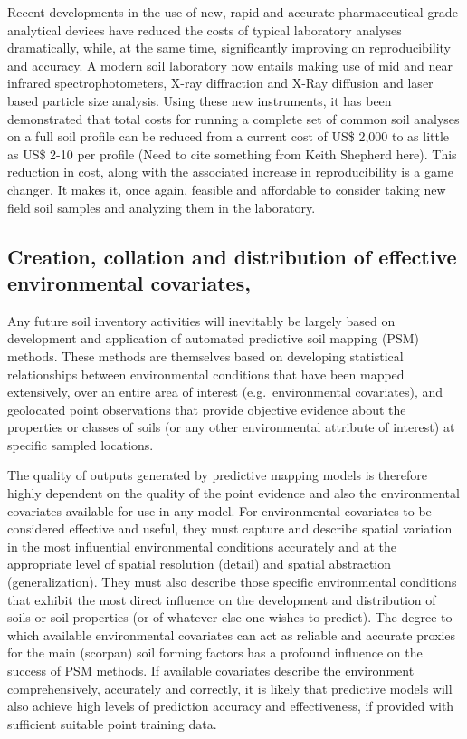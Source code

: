 \documentclass[graybox,natbib,nospthms,UStrade]{svmono}
\begin{document}
Recent developments in the use of new, rapid and accurate pharmaceutical
grade analytical devices have reduced the costs of typical laboratory
analyses dramatically, while, at the same time, significantly improving
on reproducibility and accuracy. A modern soil laboratory now entails
making use of mid and near infrared spectrophotometers, X-ray
diffraction and X-Ray diffusion and laser based particle size analysis.
Using these new instruments, it has been demonstrated that total costs
for running a complete set of common soil analyses on a full soil
profile can be reduced from a current cost of US\$ 2,000 to as little as
US\$ 2-10 per profile (Need to cite something from Keith Shepherd here).
This reduction in cost, along with the associated increase in
reproducibility is a game changer. It makes it, once again, feasible and
affordable to consider taking new field soil samples and analyzing them
in the laboratory.

\hypertarget{creation-collation-and-distribution-of-effective-environmental-covariates}{%
\subsection{Creation, collation and distribution of effective environmental covariates,}\label{creation-collation-and-distribution-of-effective-environmental-covariates}}

Any future soil inventory activities will inevitably be largely based on
development and application of automated predictive soil mapping (PSM)
methods. These methods are themselves based on developing statistical
relationships between environmental conditions that have been mapped
extensively, over an entire area of interest (e.g.~environmental
covariates), and geolocated point observations that provide objective
evidence about the properties or classes of soils (or any other
environmental attribute of interest) at specific sampled locations.

The quality of outputs generated by predictive mapping models is
therefore highly dependent on the quality of the point evidence and also
the environmental covariates available for use in any model. For
environmental covariates to be considered effective and useful, they
must capture and describe spatial variation in the most influential
environmental conditions accurately and at the appropriate level of
spatial resolution (detail) and spatial abstraction (generalization).
They must also describe those specific environmental conditions that
exhibit the most direct influence on the development and distribution of
soils or soil properties (or of whatever else one wishes to predict).
The degree to which available environmental covariates can act as
reliable and accurate proxies for the main (scorpan) soil forming
factors has a profound influence on the success of PSM methods. If
available covariates describe the environment comprehensively,
accurately and correctly, it is likely that predictive models will also
achieve high levels of prediction accuracy and effectiveness, if
provided with sufficient suitable point training data.
\end{document}
